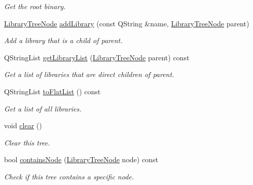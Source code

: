 \begin{DoxyCompactItemize}
\begin{DoxyCompactList}\small\item\em Get the root binary. \end{DoxyCompactList}\item 
\hyperlink{class_mdt_1_1_deploy_utils_1_1_library_tree_node}{Library\+Tree\+Node} \hyperlink{class_mdt_1_1_deploy_utils_1_1_library_tree_aed0a4f339a65e462a578e00231cf522c}{add\+Library} (const Q\+String \&name, \hyperlink{class_mdt_1_1_deploy_utils_1_1_library_tree_node}{Library\+Tree\+Node} parent)
\begin{DoxyCompactList}\small\item\em Add a library that is a child of {\itshape parent}. \end{DoxyCompactList}\item 
Q\+String\+List \hyperlink{class_mdt_1_1_deploy_utils_1_1_library_tree_a150df5c2a8a9a05c38e3172b9a4a4f21}{get\+Library\+List} (\hyperlink{class_mdt_1_1_deploy_utils_1_1_library_tree_node}{Library\+Tree\+Node} parent) const 
\begin{DoxyCompactList}\small\item\em Get a list of libraries that are direct children of {\itshape parent}. \end{DoxyCompactList}\item 
Q\+String\+List \hyperlink{class_mdt_1_1_deploy_utils_1_1_library_tree_a7ee09eb33f1f392b66017d3ab7475f53}{to\+Flat\+List} () const 
\begin{DoxyCompactList}\small\item\em Get a list of all libraries. \end{DoxyCompactList}\item 
void \hyperlink{class_mdt_1_1_deploy_utils_1_1_library_tree_a1035b22adbe9c119339ce83a33ed8eba}{clear} ()\hypertarget{class_mdt_1_1_deploy_utils_1_1_library_tree_a1035b22adbe9c119339ce83a33ed8eba}{}\label{class_mdt_1_1_deploy_utils_1_1_library_tree_a1035b22adbe9c119339ce83a33ed8eba}

\begin{DoxyCompactList}\small\item\em Clear this tree. \end{DoxyCompactList}\item 
bool \hyperlink{class_mdt_1_1_deploy_utils_1_1_library_tree_a87fc3fa448d541cc97e6dd31f6288376}{contains\+Node} (\hyperlink{class_mdt_1_1_deploy_utils_1_1_library_tree_node}{Library\+Tree\+Node} node) const 
\begin{DoxyCompactList}\small\item\em Check if this tree contains a specific node. \end{DoxyCompactList}\end{DoxyCompactItemize}



